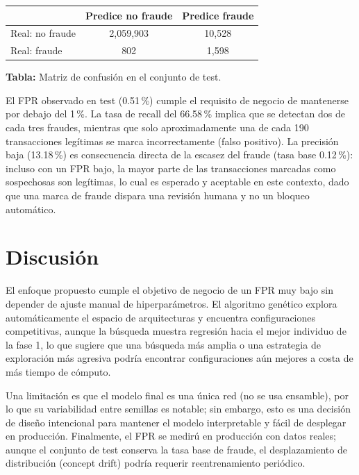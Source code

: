 \documentclass[11pt,a4paper]{article}
\begin{document}
\begin{center}
\begin{tabular}{lcc}
\toprule
 & Predice no fraude & Predice fraude \\
\midrule
Real: no fraude & 2,059,903 & 10,528 \\
Real: fraude & 802 & 1,598 \\
\bottomrule
\end{tabular}
\end{center}

\begin{center}
\textbf{Tabla:} Matriz de confusión en el conjunto de test.
\end{center}

El FPR observado en test (0.51\,\%) cumple el requisito de negocio de mantenerse por debajo del 1\,\%. La tasa de recall del 66.58\,\% implica que se detectan dos de cada tres fraudes, mientras que solo aproximadamente una de cada 190 transacciones legítimas se marca incorrectamente (falso positivo). La precisión baja (13.18\,\%) es consecuencia directa de la escasez del fraude (tasa base 0.12\,\%): incluso con un FPR bajo, la mayor parte de las transacciones marcadas como sospechosas son legítimas, lo cual es esperado y aceptable en este contexto, dado que una marca de fraude dispara una revisión humana y no un bloqueo automático.

\section{Discusión}
El enfoque propuesto cumple el objetivo de negocio de un FPR muy bajo sin depender de ajuste manual de hiperparámetros. El algoritmo genético explora automáticamente el espacio de arquitecturas y encuentra configuraciones competitivas, aunque la búsqueda muestra regresión hacia el mejor individuo de la fase 1, lo que sugiere que una búsqueda más amplia o una estrategia de exploración más agresiva podría encontrar configuraciones aún mejores a costa de más tiempo de cómputo.

Una limitación es que el modelo final es una única red (no se usa ensamble), por lo que su variabilidad entre semillas es notable; sin embargo, esto es una decisión de diseño intencional para mantener el modelo interpretable y fácil de desplegar en producción. Finalmente, el FPR se medirú en producción con datos reales; aunque el conjunto de test conserva la tasa base de fraude, el desplazamiento de distribución (concept drift) podría requerir reentrenamiento periódico.
\end{document}
